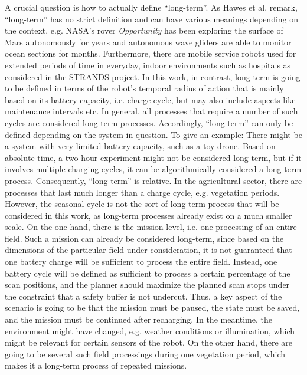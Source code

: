 \documentclass[german, master, expose, latin1]{base/thesis_KBS}
\begin{document}
A crucial question is how to actually define ``long-term''. As Hawes et al. remark, ``long-term'' has no strict definition and can have various meanings depending
on the context, e.g. NASA's rover \textit{Opportunity} has been exploring the surface of Mars autonomously for years and autonomous wave gliders are able to monitor
ocean sections for months. \cite{Hawes:2017} Furthermore, there are mobile service robots used for extended periods of time in everyday, indoor environments such as hospitals 
as considered in the STRANDS project.
In this work, in contrast, long-term is going to be defined in terms of the robot's temporal radius of action that is mainly based on its battery capacity, i.e. charge cycle,
but may also include aspects like maintenance intervals etc. In general, all processes that require a number of such cycles are considered long-term processes.
Accordingly, ``long-term'' can only be defined depending on the system in question. To give an example: There might be a system with very limited battery capacity, 
such as a toy drone. Based on absolute time, a two-hour experiment might not be considered long-term, but if it involves multiple charging cycles, it can be 
algorithmically considered a long-term process. Consequently, ``long-term'' is relative.\newline
In the agricultural sector, there are processes that last much longer than a charge cycle, e.g. vegetation periods.
However, the seasonal cycle is not the sort of long-term process that will be considered in this work, as long-term processes already exist on a much smaller scale.
On the one hand, there is the mission level, i.e. one processing of an entire field. 
Such a mission can already be considered long-term, since based on the dimensions of the particular field under consideration, it is not guaranteed that one
battery charge will be sufficient to process the entire field. Instead, one battery cycle will be defined as sufficient to process a certain percentage of the scan
positions, and the planner should maximize the planned scan stops under the constraint that a safety buffer is not undercut.
Thus, a key aspect of the scenario is going to be that the mission must be paused, the state must be saved, and the mission must be continued after recharging.
In the meantime, the environment might have changed, e.g. weather conditions or illumination, which might be relevant for certain sensors of the robot.
On the other hand, there are going to be several such field processings during one vegetation period, which makes it a long-term process of repeated missions.
\end{document}
